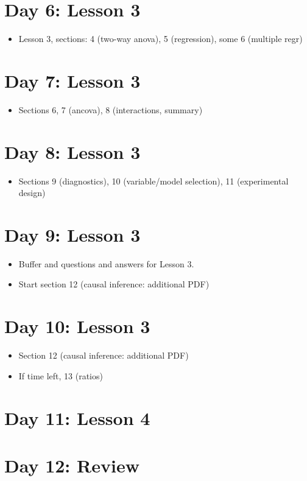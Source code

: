 \documentclass[a4paper,11pt]{article}
\begin{document}
\section*{Day 6: Lesson 3}
\label{sec:org2ae00ff}
\begin{itemize}
\item Lesson 3, sections: 4 (two-way anova), 5 (regression), some 6 (multiple regr)
\end{itemize}
\section*{Day 7: Lesson 3}
\label{sec:orgd125b0d}
\begin{itemize}
\item Sections 6, 7 (ancova), 8 (interactions, summary)
\end{itemize}
\section*{Day 8: Lesson 3}
\label{sec:org705f921}
\begin{itemize}
\item Sections 9 (diagnostics), 10 (variable/model selection), 11 (experimental design)
\end{itemize}
\section*{Day 9: Lesson 3}
\label{sec:org4a69d83}
\begin{itemize}
\item Buffer and questions and answers for Lesson 3.
\item Start section 12 (causal inference: additional PDF)
\end{itemize}
\section*{Day 10: Lesson 3}
\label{sec:org4a69d83}
\begin{itemize}
\item Section 12 (causal inference: additional PDF)
\item If time left, 13 (ratios)
\end{itemize}
\section*{Day 11: Lesson 4}
\label{sec:orgc9ffc16}

\section*{Day 12: Review}
\label{sec:org4280f0d}
\end{document}

